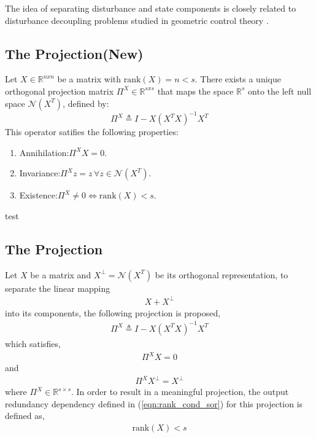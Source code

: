 The idea of separating disturbance and state components is closely related to disturbance decoupling problems studied in geometric control theory \cite{BasileMarro1992}.

\subsection{The Projection(New)}
\begin{thm}
Let $X\in \mathbb{R}^{nxn}$ be a matrix with $\mathrm{rank}(X)=n<s$. There exists a unique orthogonal projection matrix $\Pi^X\in\mathbb{R}^{sxs}$ that maps the space $\mathbb{R}^s$ onto the left null space $\mathcal{N}(X^T)$, defined by:
\begin{equation*}
    \Pi^X\triangleq I-X(X^TX)^{-1}X^T \label{eq:projection}
\end{equation*}
This operator satifies the following properties:
\begin{enumerate}
    \item Annihilation:$\Pi^X X=0$.
    \item Invariance:$\Pi^X z=z\,\forall z\in\mathcal{N}(X^T)$.
    \item Existence:$\Pi^X \neq 0 \iff \mathrm{rank}(X)<s$.
\end{enumerate}
\end{thm}
\begin{pf}
    test
\end{pf}

\subsection{The Projection}
Let $X$ be a matrix and $X^\perp=\mathcal{N}(X^T)$ be its orthogonal representation, to separate the linear mapping 
\begin{gather}
    X+X^\perp
\end{gather}
into its components, the following projection is proposed,
\begin{gather}
    \Pi^X\triangleq I-X(X^TX)^{-1}X^T \label{eq:projection}
\end{gather}
which satisfies,
\begin{gather}
    \Pi^X X=0
\end{gather}
and
\begin{gather}
    \Pi^X X^\perp=X^\perp
\end{gather}
where $\Pi^X\in\mathbb{R}^{s\times s}$. In order to result in a meaningful projection, the output redundancy dependency defined in (\ref{eqn:rank_cond_sor}) for this projection is defined as,
\begin{gather}
    \mathrm{rank}(X)<s\label{eqn:rank_cond_proj}
\end{gather}

